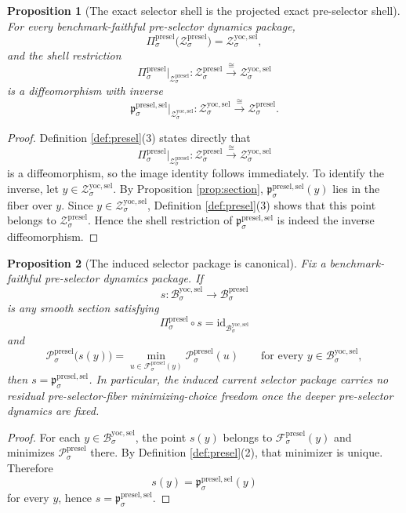 \documentclass[11pt]{article}
\newcommand{\YoctoSelectorBody}[1]{\mathcal B_{#1}^{\mathrm{yoc,sel}}}
\newcommand{\YoctoSelectorShell}[1]{\mathcal Z_{#1}^{\mathrm{yoc,sel}}}
\newcommand{\PreSelectorBody}[1]{\mathcal B_{#1}^{\mathrm{presel}}}
\newcommand{\PreSelectorProj}[1]{\Pi_{#1}^{\mathrm{presel}}}
\newcommand{\PreSelectorFiber}[2]{\mathcal F_{#1}^{\mathrm{presel}}(#2)}
\newcommand{\PreSelectorFunctional}[1]{\mathscr P_{#1}^{\mathrm{presel}}}
\newcommand{\PreSelectorSelectorMin}[1]{\mathfrak p_{#1}^{\mathrm{presel,sel}}}
\newcommand{\PreSelectorShell}[1]{\mathcal Z_{#1}^{\mathrm{presel}}}
\newtheorem{proposition}{Proposition}
\begin{document}
\begin{proposition}[The exact selector shell is the projected exact pre-selector shell]
\label{prop:shell}
For every benchmark-faithful pre-selector dynamics package,
\[
\PreSelectorProj{\sigma}\bigl(\PreSelectorShell{\sigma}\bigr)
=
\YoctoSelectorShell{\sigma},
\]
and the shell restriction
\[
\PreSelectorProj{\sigma}\big|_{\PreSelectorShell{\sigma}}
:
\PreSelectorShell{\sigma}\xrightarrow{\cong}\YoctoSelectorShell{\sigma}
\]
is a diffeomorphism with inverse
\[
\PreSelectorSelectorMin{\sigma}\big|_{\YoctoSelectorShell{\sigma}}
:
\YoctoSelectorShell{\sigma}\xrightarrow{\cong}\PreSelectorShell{\sigma}.
\]
\end{proposition}

\begin{proof}
Definition \ref{def:presel}(3) states directly that
\[
\PreSelectorProj{\sigma}\big|_{\PreSelectorShell{\sigma}}
:
\PreSelectorShell{\sigma}\xrightarrow{\cong}\YoctoSelectorShell{\sigma}
\]
is a diffeomorphism, so the image identity follows immediately. To identify the inverse, let \(y\in\YoctoSelectorShell{\sigma}\). By Proposition \ref{prop:section}, \(\PreSelectorSelectorMin{\sigma}(y)\) lies in the fiber over \(y\). Since \(y\in\YoctoSelectorShell{\sigma}\), Definition \ref{def:presel}(3) shows that this point belongs to \(\PreSelectorShell{\sigma}\). Hence the shell restriction of \(\PreSelectorSelectorMin{\sigma}\) is indeed the inverse diffeomorphism.
\end{proof}

\begin{proposition}[The induced selector package is canonical]
\label{prop:canonical}
Fix a benchmark-faithful pre-selector dynamics package. If
\[
s:\YoctoSelectorBody{\sigma}\to\PreSelectorBody{\sigma}
\]
is any smooth section satisfying
\[
\PreSelectorProj{\sigma}\circ s
=
\mathrm{id}_{\YoctoSelectorBody{\sigma}}
\]
and
\[
\PreSelectorFunctional{\sigma}\bigl(s(y)\bigr)
=
\min_{u\in\PreSelectorFiber{\sigma}{y}}
\PreSelectorFunctional{\sigma}(u)
\qquad
\text{for every }
y\in\YoctoSelectorBody{\sigma},
\]
then \(s=\PreSelectorSelectorMin{\sigma}\). In particular, the induced current selector package carries no residual pre-selector-fiber minimizing-choice freedom once the deeper pre-selector dynamics are fixed.
\end{proposition}

\begin{proof}
For each \(y\in\YoctoSelectorBody{\sigma}\), the point \(s(y)\) belongs to \(\PreSelectorFiber{\sigma}{y}\) and minimizes \(\PreSelectorFunctional{\sigma}\) there. By Definition \ref{def:presel}(2), that minimizer is unique. Therefore
\[
s(y)=\PreSelectorSelectorMin{\sigma}(y)
\]
for every \(y\), hence \(s=\PreSelectorSelectorMin{\sigma}\).
\end{proof}
\end{document}
